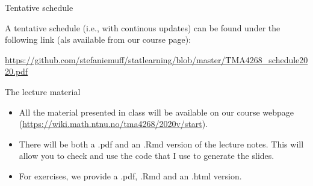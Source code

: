\documentclass[10pt,ignorenonframetext,]{beamer}
\begin{document}
\begin{frame}

\begin{block}{Tentative schedule}

\vspace{2mm}

A tentative schedule (i.e., with continous updates) can be found under
the following link (als available from our course page):

\vspace{2mm}

\url{https://github.com/stefaniemuff/statlearning/blob/master/TMA4268_schedule2020.pdf}

\end{block}

\end{frame}

\begin{frame}

\begin{block}{The lecture material}

\vspace{2mm}

\begin{itemize}
\item
  All the material presented in class will be available on our course
  webpage (\url{https://wiki.math.ntnu.no/tma4268/2020v/start}).
\item
  There will be both a .pdf and an .Rmd version of the lecture notes.
  This will allow you to check and use the code that I use to generate
  the slides.
\item
  For exercises, we provide a .pdf, .Rmd and an .html version.
\end{itemize}

\end{block}

\end{frame}
\end{document}
